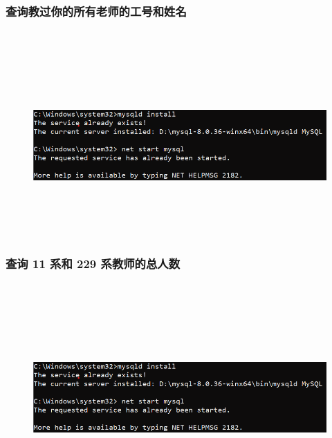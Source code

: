 \documentclass{ctexart}
\begin{document}
\subsubsection{查询教过你的所有老师的工号和姓名}
\begin{lstlisting}[language=sql]
	
\end{lstlisting}
\begin{figure}[H]
	\centering 
	\includegraphics[height=7cm,width=14cm]{1.png}
	\end{figure}
\subsubsection{查询 11 系和 229 系教师的总人数}
\begin{lstlisting}[language=sql]
	
\end{lstlisting}
\begin{figure}[H]
	\centering 
	\includegraphics[height=7cm,width=14cm]{1.png}
	\end{figure}
\end{document}
